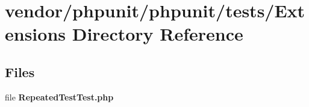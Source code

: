 \section{vendor/phpunit/phpunit/tests/\+Extensions Directory Reference}
\label{dir_17bb585fc890c80adb22acf996b0d121}
\subsection*{Files}
\begin{DoxyCompactItemize}
\item 
file {\bf Repeated\+Test\+Test.\+php}
\end{DoxyCompactItemize}
